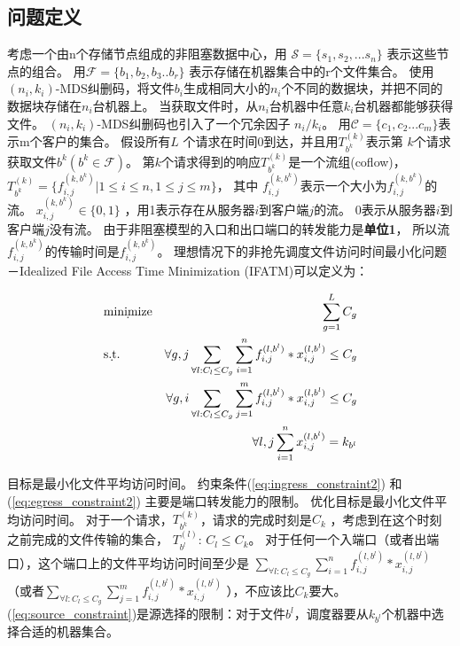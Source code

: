 \subsection{问题定义}
考虑一个由n个存储节点组成的非阻塞数据中心，用
$\mathcal{S} = \{s_1,s_2,...s_n\}$ 表示这些节点的组合。
用$\mathcal{F}=\{b_1,b_2,b_3..b_r\}$ 表示存储在机器集合中的r个文件集合。
使用$(n_i,k_i)$-MDS纠删码，将文件$b_i$生成相同大小的$n_i $个不同的数据块，并把不同的数据块存储在$n_i$台机器上。 
当获取文件时，从$n_i$台机器中任意$k_i$台机器都能够获得文件。
$(n_i, k_i)$-MDS纠删码也引入了一个冗余因子 $n_i / k_i$。 
用$\mathcal{C}=\{c_1,c_2...c_m\}$表示m个客户的集合。
假设所有$L$ 个请求在时间0到达，并且用$T^{(k)}_{b^k}$表示第 $k$个请求获取文件$b^k(b^k\in \mathcal{F})$。
第$k$个请求得到的响应$T^{(k)}_{b^k} $是一个流组(coflow)， $T^{(k)}_{b^k}=\{f_{i,j}^{(k,b^k)}|1 \le i \le n ,1\le j \le m\}$，
其中 $f_{i,j}^{(k,b^k)}$表示一个大小为$f_{i,j}^{(k,b^k)}$的流。
$x^{(k,b^k)}_{i,j}  \in \{0,1\}$ ，用1表示存在从服务器$i$到客户端$j$的流。
0表示从服务器$i$到客户端$j$没有流。
由于非阻塞模型的入口和出口端口的转发能力是\textbf{单位1}，
所以流$f_{i,j}^{(k,b^k)}$的传输时间是$f_{i,j}^{(k,b^k)}$。
理想情况下的非抢先调度文件访问时间最小化问题－Idealized File Access Time Minimization (IFATM)可以定义为：


 \begin{eqnarray}
&\d {\rm minimize} & \sum_{g=1}^{L} C_{g} \label{eq:ECSF-SC} \\
& \d{\rm s.t.} &\forall g,j\sum_{\forall l:C_l \leq C_g}\sum_{i=1}^{n}f_{i,j}^{(l,b^l)}*x_{i,j}^{(l,b^l)}\leq C_g  \label{eq:ingress_constraint2}\\
&&\forall g,i\sum_{\forall l:C_l \leq C_g}\sum_{j=1}^{m}f_{i,j}^{(l,b^l)}*x_{i,j} ^{(l,b^l)} \leq C_g   \label{eq:egress_constraint2}\\
&& \forall l,j\sum_{i=1}^nx_{i,j}^{(l,b^l)}=k_{b^l}  \label{eq:source_constraint}
\end{eqnarray}

目标是最小化文件平均访问时间。
约束条件(\ref{eq:ingress_constraint2}) 和(\ref{eq:egress_constraint2}) 主要是端口转发能力的限制。
优化目标是最小化文件平均访问时间。
对于一个请求，$T^{(k)}_{b^k}$，请求的完成时刻是$C_{k}$ ，考虑到在这个时刻之前完成的文件传输的集合， $T^{(l)}_{b^l}$: $C_{l} \le C_{k}$。
对于任何一个入端口（或者出端口），这个端口上的文件平均访问时间至少是 $\sum_{\forall l:C_l \leq C_g}\sum_{i=1}^{n}f_{i,j}^{(l,b^l)}*x_{i,j}^{(l,b^l)}$（或者$\sum_{\forall l:C_l \leq C_g}\sum_{j=1}^{m}f_{i,j}^{(l,b^l)}*x_{i,j} ^{(l,b^l)}$ ），不应该比$C_{k}$要大。
(\ref{eq:source_constraint})是源选择的限制：对于文件${b^l}$，调度器要从$k_{b^l}$个机器中选择合适的机器集合。

